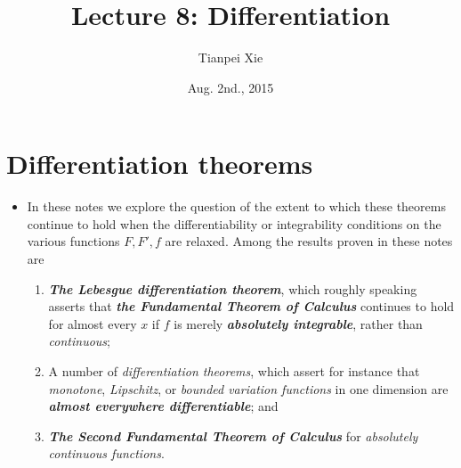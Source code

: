 \documentclass[11pt]{article}
\begin{document}
\title{Lecture 8: Differentiation}
\author{ Tianpei Xie}
\date{ Aug. 2nd., 2015 }
\maketitle
\tableofcontents
\newpage
\section{Differentiation theorems}
\begin{itemize}
\item \begin{remark}
In these notes we explore the question of the extent to which these theorems continue to hold when the differentiability or integrability
conditions on the various functions $F, F', f$ are relaxed. Among the results proven in these notes are
\begin{enumerate}
\item \emph{\textbf{The Lebesgue differentiation theorem}}, which roughly speaking asserts that \emph{\textbf{the Fundamental Theorem of Calculus}} continues to hold for almost every $x$ if $f$ is merely \emph{\textbf{absolutely integrable}}, rather than \emph{continuous};
\item A number of \emph{differentiation theorems}, which assert for instance that \emph{monotone}, \emph{Lipschitz}, or \emph{bounded variation functions} in one dimension are \emph{\textbf{almost everywhere differentiable}}; and
\item \emph{\textbf{The Second Fundamental Theorem of Calculus}} for \emph{absolutely continuous functions}.
\end{enumerate}
\end{remark}
\end{itemize}
\end{document}
